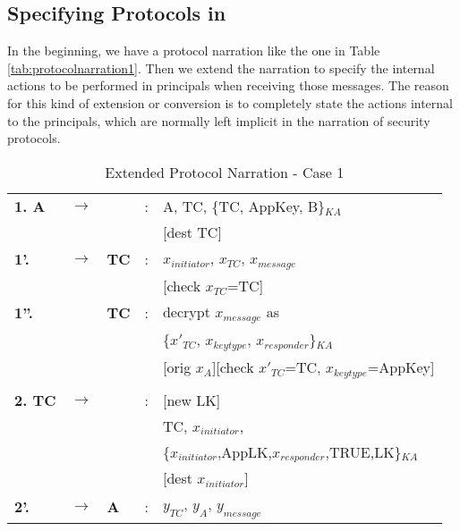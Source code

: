 \subsection{Specifying Protocols in \LYSA}
In the beginning, we have a protocol narration like the one in Table \ref{tab:protocolnarration1}. 
Then we extend the narration to specify the internal actions to be performed in principals when receiving those messages. 
The reason for this kind of extension or conversion is to completely state the actions internal to the principals, which are normally left implicit in the narration of security protocols.

\begin{table}\renewcommand{\arraystretch}{1.3}
\renewcommand{\tabcolsep}{0.02cm} \caption{Extended Protocol Narration - Case 1}
\label{tab:xpn}
\begin{tabular}{lllll}
\hline
\textbf{1. A} &\textbf{\(\rightarrow\)} &\textbf{ } &:& A, TC, \{TC, AppKey, B\}$_{KA}$ \\
               &                           &            & & [\textnormal{dest TC}] \\
\textbf{1'. } &\textbf{\(\rightarrow\)} &\textbf{TC}&:& $x_{initiator}$, $x_{TC}$, $x_{message}$ \\
               &                           &            & & [\textnormal{check } $x_{TC}$=TC]\\
\textbf{1''.} &                           &\textbf{TC}&:& \textnormal{decrypt $x_{message}$ as }\\
               &                           &            & & \{$x'_{TC}$, $x_{keytype}$, $x_{responder}$\}$_{KA}$\\
               &                           &            & & [\textnormal{orig }$x_A$][\textnormal{check } $x'_{TC}$=TC, $x_{keytype}$=AppKey]\\
               &                           &            & & \\
\textbf{2. TC}&\textbf{\(\rightarrow\)} &            &: & [\textnormal{new} LK]\\
               &                           &            && TC, $x_{initiator}$, \\
               &                           &            && \{$x_{initiator}$,AppLK,$x_{responder}$,TRUE,LK\}$_{KA}$ \\
               &                           &            && [\textnormal{dest }$x_{initiator}$] \\
\textbf{2'. } &\textbf{\(\rightarrow\)} &\textbf{A} &:& $y_{TC}$, $y_A$, $y_{message}$ \\

\end{tabular}
\end{table}
